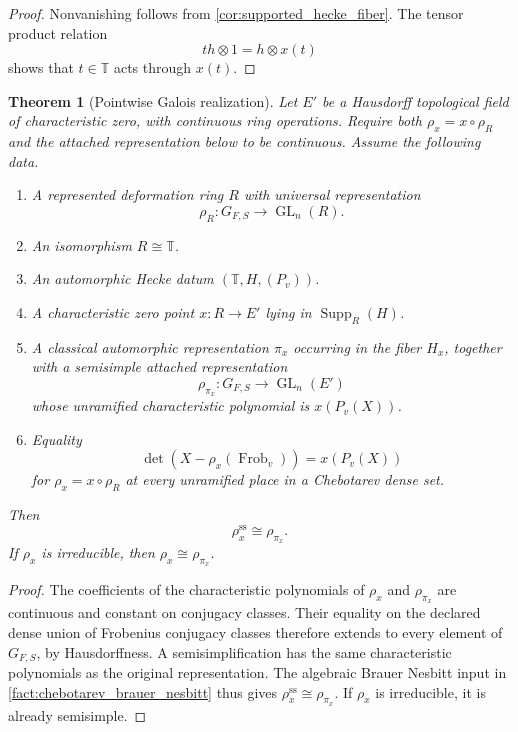 \documentclass[11pt]{amsart}
\newtheorem{theorem}{Theorem}[section]
\theoremstyle{definition}
\theoremstyle{remark}
\newcommand{\TT}{\mathbb T}
\newcommand{\Supp}{\operatorname{Supp}}
\newcommand{\Frob}{\operatorname{Frob}}
\newcommand{\GL}{\operatorname{GL}}
\begin{document}
\begin{proof}
Nonvanishing follows from \cref{cor:supported_hecke_fiber}. The tensor product relation
\[
th\otimes1=h\otimes x(t)
\]
shows that \(t\in\TT\) acts through \(x(t)\).
\end{proof}

\begin{theorem}[Pointwise Galois realization]\label{thm:pointwise_galois_realization}
Let \(E'\) be a Hausdorff topological field of characteristic zero, with continuous ring operations. Require both \(\rho_x=x\circ\rho_R\) and the attached representation below to be continuous. Assume the following data.
\begin{enumerate}
\item A represented deformation ring \(R\) with universal representation
\[
\rho_R:G_{F,S}\longrightarrow\GL_n(R).
\]
\item An isomorphism \(R\cong\TT\).
\item An automorphic Hecke datum \((\TT,H,(P_v))\).
\item A characteristic zero point \(x:R\to E'\) lying in \(\Supp_R(H)\).
\item A classical automorphic representation \(\pi_x\) occurring in the fiber \(H_x\), together with a semisimple attached representation
\[
\rho_{\pi_x}:G_{F,S}\longrightarrow\GL_n(E')
\]
whose unramified characteristic polynomial is \(x(P_v(X))\).
\item Equality
\[
\det\left(X-\rho_x(\Frob_v)\right)=x(P_v(X))
\]
for \(\rho_x=x\circ\rho_R\) at every unramified place in a Chebotarev dense set.
\end{enumerate}
Then
\[
\boxed{
\rho_x^{\mathrm{ss}}
\cong
\rho_{\pi_x}.
}
\]
If \(\rho_x\) is irreducible, then \(\rho_x\cong\rho_{\pi_x}\).
\end{theorem}

\begin{proof}
The coefficients of the characteristic polynomials of \(\rho_x\) and \(\rho_{\pi_x}\) are continuous and constant on conjugacy classes. Their equality on the declared dense union of Frobenius conjugacy classes therefore extends to every element of \(G_{F,S}\), by Hausdorffness. A semisimplification has the same characteristic polynomials as the original representation. The algebraic Brauer Nesbitt input in \cref{fact:chebotarev_brauer_nesbitt} thus gives \(\rho_x^{\mathrm{ss}}\cong\rho_{\pi_x}\). If \(\rho_x\) is irreducible, it is already semisimple.
\end{proof}
\end{document}
